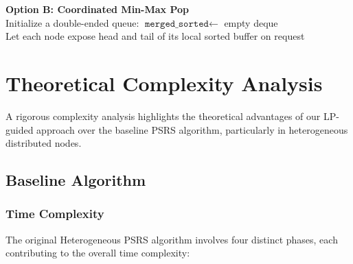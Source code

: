 \documentclass[]{interact}
\theoremstyle{plain}
\theoremstyle{definition}
\theoremstyle{remark}
\begin{document}
\begin{algorithm}[H]


\vspace{2mm}

\textbf{Option B: Coordinated Min-Max Pop} \\
Initialize a double-ended queue: $\texttt{merged\_sorted} \leftarrow$ empty deque \\
Let each node expose head and tail of its local sorted buffer on request \\



\end{algorithm}
    






\section{Theoretical Complexity Analysis}

A rigorous complexity analysis highlights the theoretical advantages of our LP-guided approach over the baseline PSRS algorithm, particularly in heterogeneous distributed nodes.

\subsection{Baseline Algorithm}

\subsubsection{Time Complexity}
The original Heterogeneous PSRS algorithm involves four distinct phases, each contributing to the overall time complexity:
\end{document}
